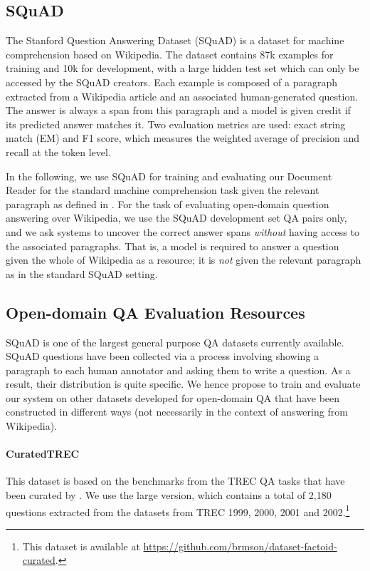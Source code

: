 \documentclass[11pt,a4paper]{article}
\newcommand\lcurq{CuratedTREC\xspace}
\begin{document}
\subsection{SQuAD}

The Stanford Question Answering Dataset (SQuAD) \cite{rajpurkar2016squad} is a dataset for machine comprehension based on Wikipedia.
The dataset contains 87k examples for training and 10k for development, with a large hidden test set which can only be accessed by the SQuAD creators.
Each example is composed of a paragraph extracted from a Wikipedia article and an associated human-generated question. The answer is always a span from this paragraph and a model is given credit if its predicted answer matches it. Two evaluation metrics are used: exact string match (EM) and F1 score, which measures the weighted average of precision and recall at the token level.

In the following, we use SQuAD for training and evaluating our Document Reader for the standard machine comprehension task given the relevant paragraph as defined in \cite{rajpurkar2016squad}.
For the task of evaluating open-domain question answering over Wikipedia, we use the SQuAD development set QA pairs only, and we ask systems to uncover the correct answer spans \emph{without} having access to the associated paragraphs. That is, a model is required to answer a question given the whole of Wikipedia as a resource; it is {\em not} given the relevant paragraph as in the standard SQuAD setting.

\subsection{Open-domain QA Evaluation Resources}\label{sec:othersources}

SQuAD is one of the largest general purpose QA datasets currently available.
SQuAD questions have been collected via a process involving showing a paragraph to each human annotator and asking them to write a question. As a result, their distribution is quite specific.
We hence propose to train and evaluate our system on other datasets developed for open-domain QA that have been constructed in different ways (not necessarily in the context of answering from Wikipedia).


\paragraph{\lcurq} This dataset is based on the
benchmarks from the TREC QA tasks that have been curated by \citet{baudivs2015modeling}.
We use the large version, which contains a total of 2,180 questions extracted from the datasets from TREC 1999, 2000, 2001 and 2002.\footnote{This dataset is available at \url{https://github.com/brmson/dataset-factoid-curated}.}
\end{document}
